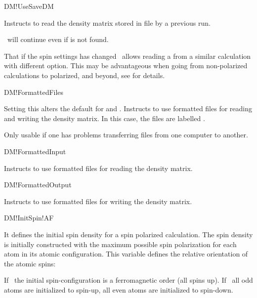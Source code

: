 \begin{fdflogicalF}{DM!UseSaveDM}
  
  Instructs to read the density matrix stored in file
   by a previous run.
  
  \siesta\ will continue even if  is not found.

  \note That if the spin settings has changed \siesta\ allows reading
  a  from a similar calculation with different 
  option. This may be advantageous when going from non-polarized
  calculations to polarized, and beyond, see  for details. 

\end{fdflogicalF}

\begin{fdflogicalF}{DM!FormattedFiles}

  Setting this alters the default for  and 
  .
  Instructs to use formatted files for reading and writing
  the density matrix. In this case, the files are labelled
  .
  
  Only usable if one has problems transferring files from one computer
  to another.

\end{fdflogicalF}

\begin{fdflogicalF}{DM!FormattedInput}

  Instructs to use formatted files for reading the density
  matrix.
  
\end{fdflogicalF}

\begin{fdflogicalF}{DM!FormattedOutput}

  Instructs to use formatted files for writing the density
  matrix.
  
\end{fdflogicalF}

\begin{fdflogicalF}{DM!InitSpin!AF}
  
  It defines the initial spin density for a spin polarized calculation.
  The spin density is initially constructed with the maximum possible
  spin polarization for each atom in its atomic configuration.
  This variable defines the relative orientation of the atomic
  spins:

  If \fdffalse\ the initial spin-configuration is a ferromagnetic
  order (all spins up).
  If \fdftrue\ all odd atoms are initialized to spin-up, all even
  atoms are initialized to spin-down.

\end{fdflogicalF}

